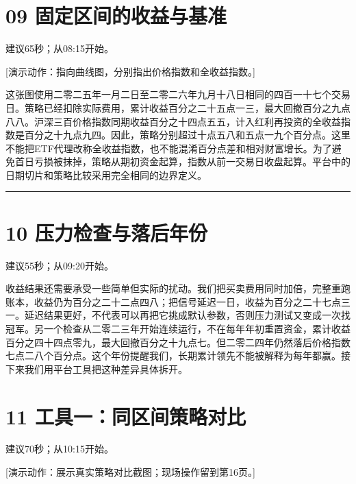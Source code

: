 \documentclass[UTF8,a4paper,12pt]{ctexart}
\begin{document}
\newpage
\section*{\color{ink}09  固定区间的收益与基准}

{\small\color{accent}建议65秒；从08:15开始。}\par

{\small\color{accent}[演示动作：指向曲线图，分别指出价格指数和全收益指数。]}\par

这张图使用二零二五年一月二日至二零二六年九月十八日相同的四百一十七个交易日。策略已经扣除实际费用，累计收益百分之二十五点一三，最大回撤百分之九点八八。沪深三百价格指数同期收益百分之十四点五五，计入红利再投资的全收益指数是百分之十九点九四。因此，策略分别超过十点五八和五点一九个百分点。这里不能把ETF代理改称全收益指数，也不能混淆百分点差和相对财富增长。为了避免首日亏损被抹掉，策略从期初资金起算，指数从前一交易日收盘起算。平台中的日期切片和策略比较采用完全相同的边界定义。


\vspace{6mm}\noindent\textcolor{accent!40}{\rule{\textwidth}{0.4pt}}\par

\section*{\color{ink}10  压力检查与落后年份}

{\small\color{accent}建议55秒；从09:20开始。}\par

收益结果还需要承受一些简单但实际的扰动。我们把买卖费用同时加倍，完整重跑账本，收益仍为百分之二十二点四八；把信号延迟一日，收益为百分之二十七点三一。延迟结果更好，不代表可以再把它挑成默认参数，否则压力测试又变成一次找冠军。另一个检查从二零二三年开始连续运行，不在每年年初重置资金，累计收益百分之四十四点零九，最大回撤百分之十九点七。但二零二四年仍然落后价格指数七点二八个百分点。这个年份提醒我们，长期累计领先不能被解释为每年都赢。接下来我们用平台工具把这种差异具体拆开。


\newpage
\section*{\color{ink}11  工具一：同区间策略对比}

{\small\color{accent}建议70秒；从10:15开始。}\par

{\small\color{accent}[演示动作：展示真实策略对比截图；现场操作留到第16页。]}\par
\end{document}
